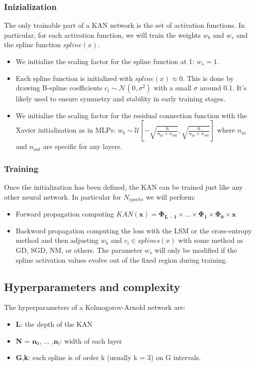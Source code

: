 \documentclass[12pt,a4paper]{article}
\begin{document}
\subsubsection{Inizialization}
The only trainable part of a KAN network is the set of activation functions. In particular, for each activation function, we will train the weights $w_b$ and $w_s$ and the spline function $spline(x)$. 
\begin{itemize}
    \item We initialize the scaling factor for the spline function at 1: $w_s=1$. 
    \item Each spline function is initialized with $spline(x) \approx 0$.  This is done by drawing B-spline coefficients $c_i \sim \mathcal{N}(0, \sigma^2)$ with a small $\sigma$ around 0.1. It's likely used to ensure symmetry and stability in early training stages.
    \item We initialize the scaling factor for the residual connection function with the Xavier initialization as in MLPs: $w_b \sim \mathcal{U}\left[-\sqrt{\frac{6}{n_{\text{in}} + n_{\text{out}}}}, \sqrt{\frac{6}{n_{\text{in}} + n_{\text{out}}}}\right]$ where $n_{in}$ and $n_{out}$ are specific for any layers.
\end{itemize}

\subsubsection{Training}
Once the initialization has been defined, the KAN can be trained just like any other neural network. In particular for $N_{epochs}$ we will perform:
\begin{itemize}
    \item Forward propagation computing $KAN(\textbf{x}) = \boldsymbol{\Phi_{L-1}} \times \dots \times \boldsymbol{\Phi_{1}} \times \boldsymbol{\Phi_{0}} \times \textbf{x}$
    \item Backword propagation computing the loss with the LSM or the cross-entropy method and then adjusting $w_b$ and $c_i \in splines(x)$ with some method as GD, SGD, NM, or others. The parameter $w_s$ will only be modified if the spline activation values evolve
    out of the fixed region during training.
\end{itemize}

\subsection{Hyperparameters and complexity}
The hyperparameters of a Kolmogorov-Arnold network are:
\begin{itemize}
    \item \textbf{L}: the depth of the KAN
    \item \textbf{N} = $\textbf{n}_0$, ... ,$\textbf{n}_l$: width of each layer
    \item \textbf{G},\textbf{k}: each spline is of order k (usually k = 3) on G intervals.
\end{itemize}
\end{document}
